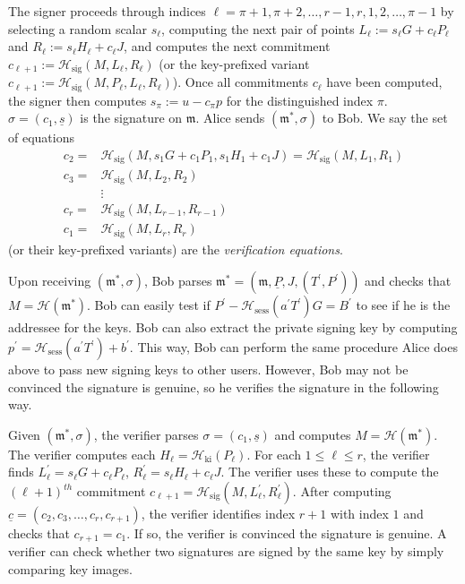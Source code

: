 \documentclass{iacrtrans}
\theoremstyle{definition}
\numberwithin{theorem}{subsection}
\numberwithin{lemma}{theorem}
\newcommand{\m}{\mathfrak{m}}
\begin{document}
The signer proceeds through indices $\ell=\pi+1, \pi+2, \ldots, r-1, r, 1, 2, \ldots, \pi-1$ 
by selecting a random scalar $s_\ell$, computing the next pair of points $L_\ell := s_\ell G + c_\ell P_\ell$ and $R_\ell := s_\ell H_\ell + c_\ell J$, and computes the next commitment $c_{\ell+1}:=\mathcal{H}_{\text{sig}}(M,L_\ell, R_\ell)$ (or the key-prefixed variant $c_{\ell+1}:=\mathcal{H}_{\text{sig}}(M,P_\ell, L_\ell, R_\ell)$). Once all commitments $c_\ell$ have been computed, the signer then computes $s_{\pi} := u - c_{\pi}p$ for the distinguished index $\pi$.   $\sigma=(c_1, \underline{s})$  is the signature on $\m$. Alice sends $(\m^*, \sigma)$ to Bob. We say the set of equations \begin{align*}
c_2 =& \mathcal{H}_{\text{sig}}(M, s_1 G + c_1 P_1, s_1 H_1 + c_1 J) = \mathcal{H}_{\text{sig}}(M, L_1, R_1)\\
c_3 =& \mathcal{H}_{\text{sig}}(M, L_2, R_2)\\
& \vdots \\
c_r =& \mathcal{H}_{\text{sig}}(M, L_{r-1}, R_{r-1})\\
c_1 =& \mathcal{H}_{\text{sig}}(M, L_r, R_r)
\end{align*} (or their key-prefixed variants) are the \textit{verification equations}.

Upon receiving $(\m^*, \sigma)$, Bob parses $\m^* = (\m, \underline{P}, J, (T^\prime, P^\prime))$ and checks that $M = \mathcal{H}(\m^*)$. Bob can easily test if $P^{\prime} - \mathcal{H}_{\text{sess}}(a^\prime T^\prime)G = B^\prime$ to see if he is the addressee for the keys. Bob can also extract the private signing key by computing $p^\prime = \mathcal{H}_{\text{sess}}(a^\prime T^\prime) + b^\prime$. This way, Bob can perform the same procedure Alice does above to pass new signing keys to other users. However, Bob may not be convinced the signature is genuine, so he verifies the signature in the following way.

Given $(\m^*, \sigma)$, the verifier parses $\sigma = (c_1, \underline{s})$ and computes $M = \mathcal{H}(\m^*)$. The verifier computes each $H_\ell = \mathcal{H}_{\text{ki}}(P_\ell)$. For each $1 \leq \ell \leq r$, the verifier finds $L_{\ell}^{\prime} = s_\ell G + c_\ell P_\ell$, $R_{\ell}^{\prime} = s_\ell H_\ell + c_\ell J$. The verifier uses these to compute the $(\ell+1)^{th}$ commitment $c_{\ell+1} = \mathcal{H}_{\text{sig}}(M, L_{\ell}^{\prime}, R_{\ell}^{\prime})$. After computing $\underline{c} = (c_2, c_3, \ldots, c_r, c_{r+1})$, the verifier identifies index $r+1$ with index $1$ and checks that $c_{r+1} = c_1$. If so, the verifier is convinced the signature is genuine. A verifier can check whether two signatures are signed by the same key by simply comparing key images.
\end{document}
